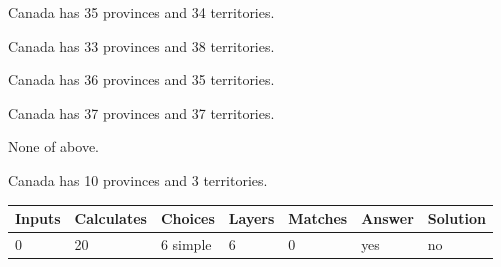 \documentclass[12pt]{article}
\begin{document}
 
Canada has  %
35 provinces and  %
34 territories.
 
 
Canada has  %
33 provinces and  %
38 territories.
 
 
Canada has  %
36 provinces and  %
35 territories.
 
 
Canada has  %
37 provinces and  %
37 territories.
 
 
 None of above.
 
 
\noindent{}
 
 
Canada has  %
10 provinces and  %
3 territories.
 
 
\noindent{}
 
 
   
   
   
   
\noindent\begin{tabular}{|l|l|l|l|l|l|l|}
 \hline
Inputs & Calculates & Choices & Layers & Matches & Answer & Solution \\ \hline
           0  & 
          20  & 
           6
  simple  
  & 
           6  & 
           0  & 
  yes & 
  no 
  \\ \hline
 \end{tabular}
   
   
   
   
\noindent{}
   
   
  
\end{document}
